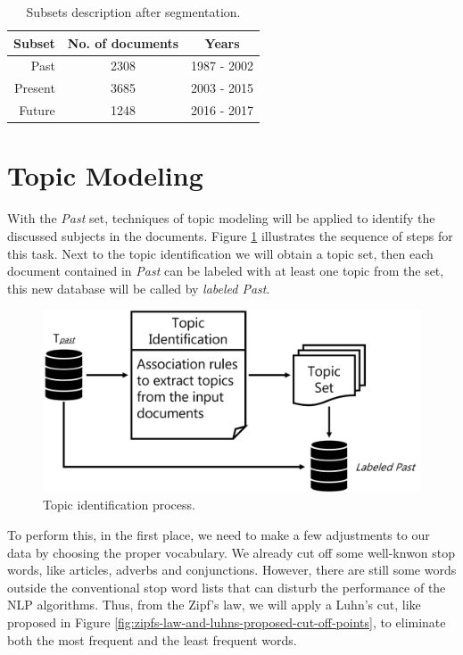 \begin{table}[h!]
	\centering
	\caption{Subsets description after segmentation.}
	\label{tab:database-description}
	\begin{tabular}{r|cc}
		\toprule
		 Subset & No. of documents &    Years    \\ \midrule
		   Past &       2308       & 1987 - 2002 \\
		Present &       3685       & 2003 - 2015 \\
		 Future &       1248       & 2016 - 2017 \\ \bottomrule
	\end{tabular}
\end{table}

\section{Topic Modeling}

With the \textit{Past} set, techniques of topic modeling will be applied to identify the discussed subjects in the documents. Figure \ref{fig:topic-identification} illustrates the sequence of steps for this task. Next to the topic identification we will obtain a topic set, then each document contained in \textit{Past} can be labeled with at least one topic from the set, this new database will be called by \textit{labeled Past}.

\begin{figure}[h!]
	\centering
	\includegraphics[width=0.8\linewidth]{01.Chapters/04.Materials/topic-identification}
	\caption{Topic identification process.}
	\label{fig:topic-identification}
\end{figure}

To perform this, in the first place, we need to make a few adjustments to our data by choosing the proper vocabulary. We already cut off some well-knwon stop words, like articles, adverbs and conjunctions. However, there are still some words outside the conventional stop word lists that can disturb the performance of the NLP algorithms. Thus, from the Zipf's law, we will apply a Luhn's cut, like proposed in Figure \ref{fig:zipfs-law-and-luhns-proposed-cut-off-points}, to eliminate both the most frequent and the least frequent words.

